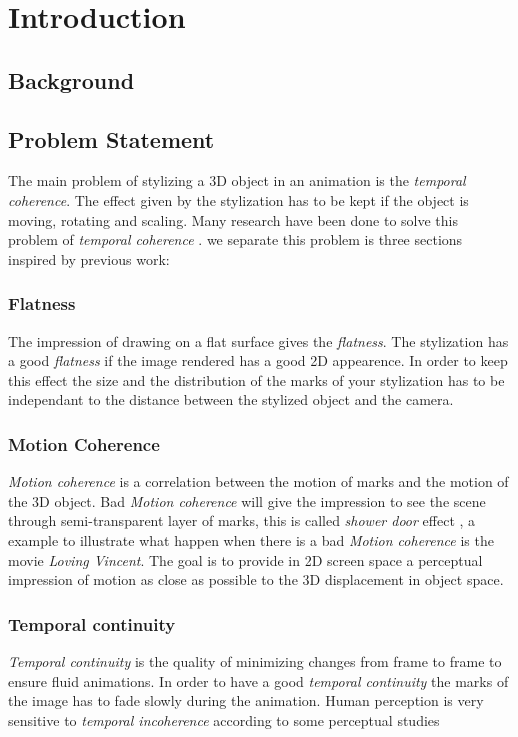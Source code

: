 \chapter{Introduction}


\section{Background}

\section{Problem Statement}

The main problem of stylizing a 3D object in an animation is the \textit{temporal coherence}. The effect given by the stylization has to be kept if the object is moving, rotating and scaling. Many research have been done to solve this problem of \textit{temporal coherence} \cite{vergne_implicit_2011, benard_dynamic_2009, bleron_motion-coherent_2018}. we separate this problem is three sections inspired by previous work\cite{meier_painterly_1996, cunzi_dynamic_nodate, breslav_dynamic_nodate}:

\subsection{Flatness}

The impression of drawing on a flat surface gives the \textit{flatness}. The stylization has a good \textit{flatness} if the image rendered has a good 2D appearence. In order to keep this effect the size and the distribution of the marks of your stylization has to be independant to the distance between the stylized object and the camera.

\subsection{Motion Coherence}

\textit{Motion coherence} is a correlation between the motion of marks and the motion of the 3D object. Bad \textit{Motion coherence} will give the impression to see the scene through semi-transparent layer of marks, this is called \textit{shower door} effect \cite{meier_painterly_1996}, a example to illustrate what happen when there is a bad \textit{Motion coherence} is the movie \textit{Loving Vincent}\cite{LovingVincent}. The goal is to provide in 2D screen space a perceptual impression of motion as
close as possible to the 3D displacement in object space.

\subsection{Temporal continuity}

\textit{Temporal continuity} is the quality of minimizing changes from frame to frame to ensure fluid animations. In order to have a good \textit{temporal continuity} the marks of the image has to fade slowly during the animation. Human perception is very sensitive to \textit{temporal incoherence} according to some perceptual studies\cite{percept_studies, Schwarz_2009}
